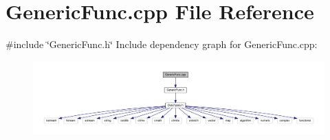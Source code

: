 \section{Generic\+Func.\+cpp File Reference}
\label{_generic_func_8cpp}
{\ttfamily \#include \char`\"{}Generic\+Func.\+h\char`\"{}}\newline
Include dependency graph for Generic\+Func.\+cpp\+:\nopagebreak
\begin{figure}[H]
\begin{center}
\leavevmode
\includegraphics[width=350pt]{_generic_func_8cpp__incl}
\end{center}
\end{figure}
